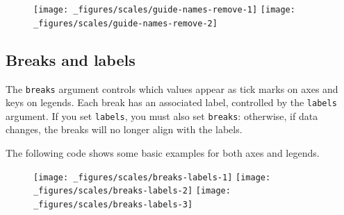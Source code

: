\begin{figure}[H]
  \texttt{[image: \_figures/scales/guide-names-remove-1]}%
  \texttt{[image: \_figures/scales/guide-names-remove-2]}
\end{figure}

\subsection{Breaks and labels}

The \texttt{breaks} argument controls which values appear as tick marks
on axes and keys on legends. Each break has an associated label,
controlled by the \texttt{labels} argument. If you set \texttt{labels},
you must also set \texttt{breaks}: otherwise, if data changes, the
breaks will no longer align with the labels. 
  

The following code shows some basic examples for both axes and legends.

\begin{Shaded}
\begin{Highlighting}[]
\StringTok{ }\NormalTok{(} \NormalTok{(}\NormalTok{, }\NormalTok{, }\NormalTok{) *}\StringTok{ }\NormalTok{, } \NormalTok{)}
\StringTok{ }\StringTok{ }
\StringTok{  }\NormalTok{() +}\StringTok{ }
\StringTok{  }\NormalTok{(} \NormalTok{, } \NormalTok{)}
\StringTok{ }\NormalTok{(} \NormalTok{(}\NormalTok{, }\NormalTok{))}
\StringTok{ }\NormalTok{(} \NormalTok{(}\NormalTok{, }\NormalTok{), } \NormalTok{(}\NormalTok{, }\NormalTok{))}
\end{Highlighting}
\end{Shaded}

\begin{figure}[H]
  \texttt{[image: \_figures/scales/breaks-labels-1]}%
  \texttt{[image: \_figures/scales/breaks-labels-2]}%
  \texttt{[image: \_figures/scales/breaks-labels-3]}
\end{figure}

